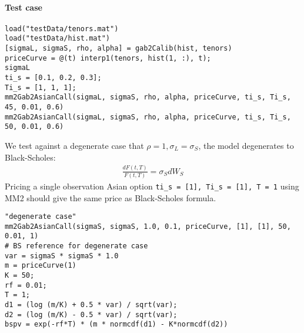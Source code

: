\documentclass[12pt,a4paper,hidelinks,fleqn]{article}            %
\begin{document}
\paragraph{Test case}
\begin{verbatim}
load("testData/tenors.mat")
load("testData/hist.mat")
[sigmaL, sigmaS, rho, alpha] = gab2Calib(hist, tenors)
priceCurve = @(t) interp1(tenors, hist(1, :), t);
sigmaL
ti_s = [0.1, 0.2, 0.3];
Ti_s = [1, 1, 1];
mm2Gab2AsianCall(sigmaL, sigmaS, rho, alpha, priceCurve, ti_s, Ti_s, 45, 0.01, 0.6)
mm2Gab2AsianCall(sigmaL, sigmaS, rho, alpha, priceCurve, ti_s, Ti_s, 50, 0.01, 0.6)
\end{verbatim}

We test against a degenerate case that $\rho = 1, \sigma_L = \sigma_S$, the model degenerates to Black-Scholes:
\begin{align*}
\frac{dF(t, T)}{F(t, T)} = \sigma_S dW_S
\end{align*}
Pricing a single observation Asian option \verb~ti_s = [1], Ti_s = [1], T = 1~ using MM2 should give the same price as Black-Scholes formula.
\begin{verbatim}
"degenerate case"
mm2Gab2AsianCall(sigmaS, sigmaS, 1.0, 0.1, priceCurve, [1], [1], 50, 0.01, 1)
# BS reference for degenerate case
var = sigmaS * sigmaS * 1.0
m = priceCurve(1)
K = 50;
rf = 0.01;
T = 1;
d1 = (log (m/K) + 0.5 * var) / sqrt(var);
d2 = (log (m/K) - 0.5 * var) / sqrt(var);
bspv = exp(-rf*T) * (m * normcdf(d1) - K*normcdf(d2))
\end{verbatim}
\end{document}

